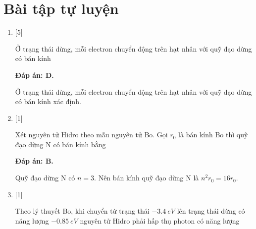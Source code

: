 \section{Bài tập tự luyện}
\begin{enumerate}[label=\bfseries Câu \arabic*:]
	
	\item {} [5]
	\cauhoi
	{Ở trạng thái dừng, mỗi electron chuyển động trên hạt nhân với quỹ đạo dừng có bán kính
	}
	
	\loigiai
	{		\textbf{Đáp án: D.}
		
		Ở trạng thái dừng, mỗi electron chuyển động trên hạt nhân với quỹ đạo dừng có bán kính xác định.		
	}
	
	\item {} [1] 
		\cauhoi
	{Xét nguyên tử Hidro theo mẫu nguyên tử Bo. Gọi $ r_{0} $ là bán kính Bo thì quỹ đạo dừng N có bán kính bằng
	}
	
	\loigiai
	{		\textbf{Đáp án: B.}	
		
		Quỹ đạo dừng N có $ n = 3 $. Nên bán kính quỹ đạo dừng N là $ n^{2} r_{0} = 16 r_{0} $.
	}
	
	\item {} [1]
		\cauhoi
	{Theo lý thuyết Bo, khi chuyển từ trạng thái $ \SI{-3,4}{eV} $ lên trạng thái dừng có năng lượng $ \SI{-0,85}{eV} $ nguyên tử Hidro phải hấp thụ photon có năng lượng
	}
	

\end{enumerate}
